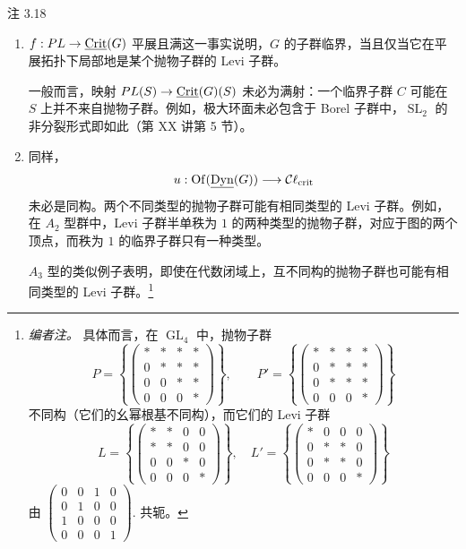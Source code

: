\begin{sgastatement}{注 3.18}
\begin{enumerate}[label=\textup{(\roman*)}]
\item \(f:PL\to\underline{\operatorname{Crit}}(G)\) 平展且满这一事实说明，\(G\) 的子群临界，当且仅当它在平展拓扑下局部地是某个抛物子群的 Levi 子群。

一般而言，映射 \(PL(S)\to\underline{\operatorname{Crit}}(G)(S)\) 未必为满射：一个临界子群 \(C\) 可能在 \(S\) 上并不来自抛物子群。例如，极大环面未必包含于 Borel 子群中，\(\operatorname{SL}_2\) 的非分裂形式即如此（第 XX 讲第 5 节）。
\item 同样，
\[
 u:\operatorname{Of}(\underline{\operatorname{Dyn}}(G))
 \longrightarrow\mathcal C\ell_{\mathrm{crit}}
\]
未必是同构。两个不同类型的抛物子群可能有相同类型的 Levi 子群。例如，在 \(A_2\) 型群中，Levi 子群半单秩为 \(1\) 的两种类型的抛物子群，对应于图的两个顶点，而秩为 \(1\) 的临界子群只有一种类型。

\(A_3\) 型的类似例子表明，即使在代数闭域上，互不同构的抛物子群也可能有相同类型的 Levi 子群。\footnote{\emph{编者注。} 具体而言，在 \(\operatorname{GL}_4\) 中，抛物子群
\[
 P=\left\{\begin{pmatrix}
 *&*&*&*\\0&*&*&*\\0&0&*&*\\0&0&0&*
 \end{pmatrix}\right\},
 \qquad
 P'=\left\{\begin{pmatrix}
 *&*&*&*\\0&*&*&*\\0&*&*&*\\0&0&0&*
 \end{pmatrix}\right\}
\]
不同构（它们的幺幂根基不同构），而它们的 Levi 子群
\[
 L=\left\{\begin{pmatrix}
 *&*&0&0\\ *&*&0&0\\0&0&*&0\\0&0&0&*
 \end{pmatrix}\right\},
 \quad
 L'=\left\{\begin{pmatrix}
 *&0&0&0\\0&*&*&0\\0&*&*&0\\0&0&0&*
 \end{pmatrix}\right\}
\]
由
\(
\left(\begin{smallmatrix}
0&0&1&0\\0&1&0&0\\1&0&0&0\\0&0&0&1
\end{smallmatrix}\right).
\)
共轭。}
\end{enumerate}
\end{sgastatement}

